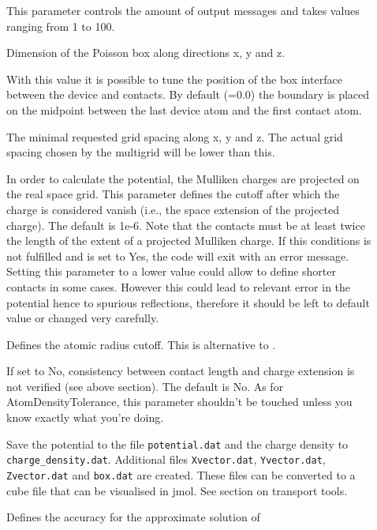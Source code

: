 \begin{description}
\item[] This parameter controls the amount of output messages
  and takes values ranging from 1 to 100.
\item[] Dimension of the Poisson box
  along directions x, y and z.
\item[] With this value it is possible 
  to tune the position of the box interface between the device and contacts.
  By default (=0.0) the boundary is placed on the midpoint
  between the last device atom and the first contact atom.
\item[] The minimal requested grid
  spacing along x, y and z. The actual grid spacing chosen by the multigrid will
  be lower than this.
\item[] In order to calculate the potential, the
  Mulliken charges are projected on the real space grid. This parameter
  defines the cutoff after which the charge is considered vanish (i.e., the
  space extension of the projected charge). The default is 1e-6. Note that the
  contacts must be at least twice the length of the extent of a projected
  Mulliken charge. If this conditions is not fulfilled and is set to Yes, the
  code will exit with an error message. Setting this parameter to a lower
  value could allow to define shorter contacts in some cases. However this
  could lead to relevant error in the potential hence to spurious reflections,
  therefore it should be left to default value or changed very carefully.
\item[]  Defines the atomic radius
  cutoff. This is alternative to .
\item[] If set to No, consistency between contact length and
  charge extension is not verified (see above section). The default is No. As
  for AtomDensityTolerance, this parameter shouldn't be touched unless you
  know exactly what you're doing.
\item[] Save the potential to the file \verb|potential.dat| and 
	the charge density to \verb|charge_density.dat|.
  Additional files \verb|Xvector.dat|, \verb|Yvector.dat|, \verb|Zvector.dat| and
  \verb|box.dat| are created. These files can be converted to a cube file that
  can be visualised in jmol. See section on transport tools.
\item[] Defines the accuracy for the approximate solution of

\end{description}

